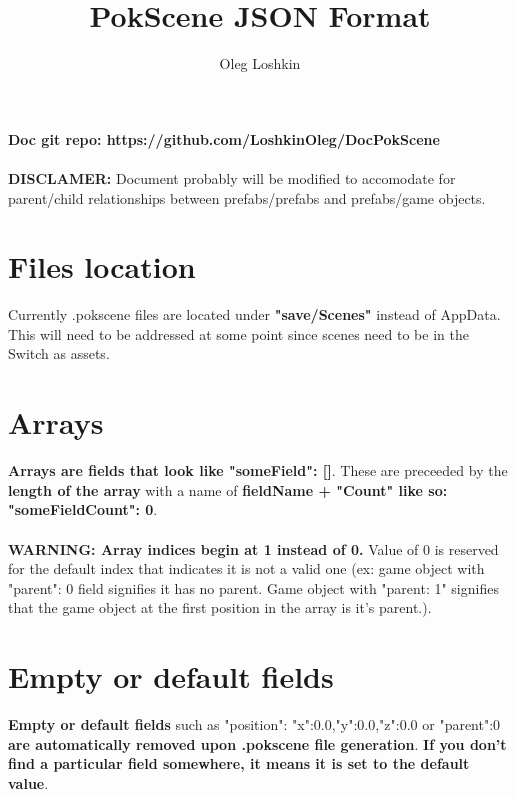 \documentclass[10pt,a4paper]{article}
\author{Oleg Loshkin}
\title{PokScene JSON Format}
\begin{document}
\maketitle
\noindent \textbf{Doc git repo: https://github.com/LoshkinOleg/DocPokScene}\\\\
\textbf{DISCLAMER:} Document probably will be modified to accomodate for parent/child relationships between prefabs/prefabs and prefabs/game objects.

\section{Files location}
Currently .pokscene files are located under \textbf{"save/Scenes"} instead of AppData. This will need to be addressed at some point since scenes need to be in the Switch as assets.

\section{Arrays}
\textbf{Arrays are fields that look like "someField": []}. These are preceeded by the \textbf{length of the array} with a name of \textbf{fieldName + "Count" like so: "someFieldCount": 0}.\\\\
\textbf{WARNING: Array indices begin at 1 instead of 0.} Value of 0 is reserved for the default index that indicates it is not a valid one (ex: game object with "parent": 0 field signifies it has no parent. Game object with "parent: 1" signifies that the game object at the first position in the array is it's parent.).

\section{Empty or default fields}
\textbf{Empty or default fields} such as "position": {"x":0.0,"y":0.0,"z":0.0} or "parent":0 \textbf{are automatically removed upon .pokscene file generation}. \textbf{If you don't find a particular field somewhere, it means it is set to the default value}.

\newpage
\end{document}
